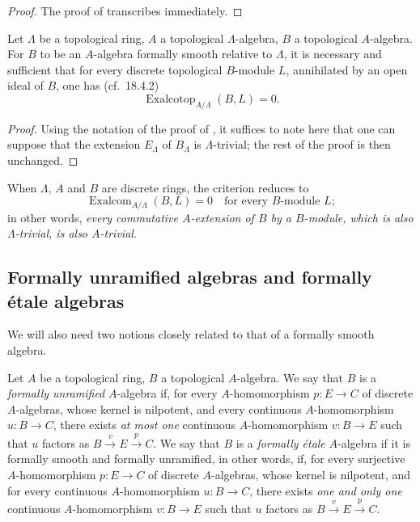 \begin{proof}
The proof of  transcribes immediately.
\end{proof}

\begin{proposition}[19.9.8]
\label{0.19.9.8}
Let $\Lambda$ be a topological ring, $A$ a topological $\Lambda$-algebra, $B$ a topological $A$-algebra.
For $B$ to be an $A$-algebra formally smooth relative to $\Lambda$, it is necessary and sufficient that for every discrete topological $B$-module $L$, annihilated by an open ideal of $B$, one has (cf.\ 18.4.2)
\[
  \operatorname{Exalcotop}_{A/\Lambda}(B,L) = 0.
\]
\end{proposition}

\begin{proof}
Using the notation of the proof of , it suffices to note here that one can suppose that the extension $E_\Lambda$ of $B_\Lambda$ is $\Lambda$-trivial; the rest of the proof is then unchanged.
\end{proof}

When $\Lambda$, $A$ and $B$ are discrete rings, the criterion  reduces to
\begin{equation}
\tag{19.9.8.1}
  \label{0.19.9.8.1}
  \operatorname{Exalcom}_{A/\Lambda}(B,L) = 0 \quad\text{for every $B$-module $L$};
\end{equation}
in other words, \emph{every commutative $A$-extension of $B$ by a $B$-module, which is also $\Lambda$-trivial, is also $A$-trivial}.

\subsection{Formally unramified algebras and formally \'{e}tale algebras}
\label{subsection:0.19.10}

\begin{env}[19.10.1]
\label{0.19.10.1}
We will also need two notions closely related to that of a formally smooth algebra.
\end{env}

\begin{definition}[19.10.2]
\label{0.19.10.2}
Let $A$ be a topological ring, $B$ a topological $A$-algebra.
We say that $B$ is a \emph{formally unramified} $A$-algebra if, for every $A$-homomorphism $p:E\to C$ of discrete $A$-algebras, whose kernel is nilpotent, and every continuous $A$-homomorphism $u:B\to C$, there exists \emph{at most one} continuous $A$-homomorphism $v:B\to E$ such that $u$ factors as $B\xrightarrow{v}E\xrightarrow{p}C$.
We say that $B$ is a \emph{formally \'{e}tale} $A$-algebra if it is formally smooth and formally unramified, in other words, if, for every surjective $A$-homomorphism $p:E\to C$ of discrete $A$-algebras, whose kernel is nilpotent, and for every continuous $A$-homomorphism $u:B\to C$, there exists \emph{one and only one} continuous $A$-homomorphism $v:B\to E$ such that $u$ factors as $B\xrightarrow{v}E\xrightarrow{p}C$.
\end{definition}

